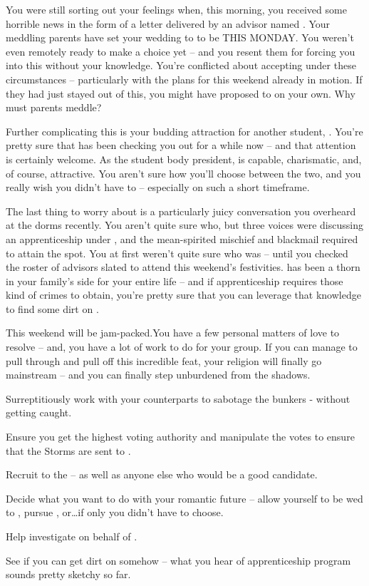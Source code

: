 \documentclass[char]{GL2020}
\begin{document}
You were still sorting out your feelings when, this morning, you received some horrible news in the form of a letter delivered by an advisor named \cDiplomat{}. Your meddling parents have set your wedding to \cHeir{} to be THIS MONDAY. You weren’t even remotely ready to make a choice yet -- and you resent them for forcing you into this without your knowledge. You’re conflicted about accepting under these circumstances -- particularly with the \pGoaties{} plans for this weekend already in motion. If they had just stayed out of this, you might have proposed to \cHeir{} on your own. Why must parents meddle?
 
Further complicating this is your budding attraction for another student, \cPresident{}. You’re pretty sure that \cPresident{} has been checking you out for a while now -- and that attention is certainly welcome. As the student body president, \cPresident{} is capable, charismatic, and, of course, attractive. You aren’t sure how you’ll choose between the two, and you really wish you didn’t have to -- especially on such a short timeframe.
 
The last thing to worry about is a particularly juicy conversation you overheard at the dorms recently. You aren’t quite sure who, but three voices were discussing an apprenticeship under \cEvil{}, and the mean-spirited mischief and blackmail required to attain the spot. You at first weren’t quite sure who \cEvil{} was -- until you checked the roster of advisors slated to attend this weekend’s festivities. \cEvil{} has been a thorn in your family’s side for your entire life -- and if \cEvil{\their} apprenticeship requires those kind of crimes to obtain, you’re pretty sure that you can leverage that knowledge to find some dirt on \cEvil{\them}.
 
This weekend will be jam-packed.You have a few personal matters of love to resolve -- and, you have a lot of work to do for your group. If you can manage to pull through and pull off this incredible feat, your religion will finally go mainstream -- and you can finally step unburdened from the shadows.
 
\begin{itemz}[Goals]
	\item Surreptitiously work with your counterparts to sabotage the bunkers - without getting caught.
	\item Ensure you get the highest voting authority and manipulate the votes to ensure that the Storms are sent to \pSc{}.
	\item Recruit \cAmbition{} to the \pGoaties{} -- as well as anyone else who would be a good candidate.
	\item Decide what you want to do with your romantic future -- allow yourself to be wed to \cHeir{}, pursue \cPresident{}, or\ldots if only you didn't have to choose.
	\item Help investigate \cChupSecond{} on behalf of \cChupLeader{}.
	\item See if you can get dirt on \cEvil{} somehow -- what you hear of \cEvil{\their} apprenticeship program sounds pretty sketchy so far.
\end{itemz}
 
\end{document}
